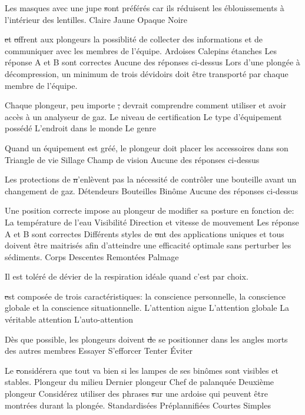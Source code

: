 \documentclass[english,10pt,twoside]{article}
\begin{document}
\begin{outline}
		\1 Les masques avec une jupe \st sont préférés car ils réduisent les éblouissements à l'intérieur des lentilles.
			\2 Claire
			\2 Jaune
			\2 Opaque
			\2 Noire

		\1 \st et \st offrent aux plongeurs la possiblité de collecter des informations et de communiquer avec les membres de l'équipe.
			\2 Ardoises
			\2 Calepins	étanches
			\2 Les réponse A et B sont correctes
			\2 Aucune des réponses ci-dessus
		\1 Lors d'une plongée à décompression, un minimum de trois dévidoirs doit être transporté par chaque membre de l'équipe.\vf

		\1 Chaque plongeur, peu importe \st, devrait comprendre comment utiliser et avoir accès à un analyseur de gaz.
			\2 Le niveau de certification
			\2 Le type d'équipement possédé
			\2 L'endroit dans le monde
			\2 Le genre

		\1 Quand un équipement est gréé, le plongeur doit placer les accessoires dans son \st
			\2 Triangle de vie
			\2 Sillage
			\2 Champ de vision
			\2 Aucune des réponses ci-dessus

		\1 Les protections de \st n'enlèvent pas la nécessité de contrôler une bouteille avant un changement de gaz.
			\2 Détendeurs
			\2 Bouteilles
			\2 Binôme
			\2 Aucune des réponses ci-dessus

		\1 Une position correcte impose au plongeur de modifier sa posture en fonction de:
			\2 La température de l'eau
			\2 Visibilité
			\2 Direction et vitesse de mouvement
			\2 Les réponse A et B sont correctes
		\1 Différents styles de \st ont des applications uniques et tous doivent être maitrisés afin d'atteindre une efficacité optimale sans perturber les sédiments.
			\2 Corps
			\2 Descentes
			\2 Remontées
			\2 Palmage

		\1 Il est toléré de dévier de la respiration idéale quand c'est par choix. \vf

		\1 \st est composée de trois caractéristiques: la conscience personnelle, la conscience globale et la conscience situationnelle.
			\2 L'attention aigue
			\2 L'attention globale
			\2 La véritable attention
			\2 L'auto-attention

		\1 Dès que possible, les plongeurs doivent \st de se positionner dans les angles morts des autres membres
			\2 Essayer
			\2 S'efforcer
			\2 Tenter
			\2 Éviter

		\1 Le  \st considérera que tout va bien si les lampes de ses binômes sont visibles et stables.
			\2 Plongeur du milieu
			\2 Dernier plongeur
			\2 Chef de palanquée
			\2 Deuxième plongeur
		\1 Considérez utiliser des phrases \st sur une ardoise qui peuvent être montrées durant la plongée.
			\2 Standardisées
			\2 Préplannifiées
			\2 Courtes
			\2 Simples


\end{outline}
\end{document}
